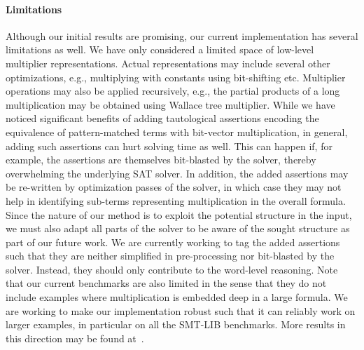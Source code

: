 

%

\paragraph{\bf Limitations}
%
Although our initial results are promising, our current implementation
has several limitations as well.
%
We have only considered a limited space of low-level multiplier
representations.  Actual representations may include several other
optimizations, e.g., multiplying with constants using bit-shifting
etc.
%
Multiplier operations may also be applied recursively, e.g., the
partial products of a long multiplication may be obtained using
Wallace tree multiplier.
%
While we have noticed significant benefits of adding tautological
assertions encoding the equivalence of pattern-matched terms with
bit-vector multiplication, in general, adding such assertions can hurt
solving time as well.  This can happen if, for example, the assertions
are themselves bit-blasted by the solver, thereby overwhelming the
underlying SAT solver.
%
In addition, the added assertions may be re-written by optimization
passes of the solver, in which case they may not help in identifying
sub-terms representing multiplication in the overall formula.
%
Since the nature of our method is to exploit the potential
structure in the input, we must also adapt all parts of the solver
to be aware of the sought structure as part of our future work.
%
We are currently working to tag the added assertions such that they
are neither simplified in pre-processing nor bit-blasted by the solver.
%
Instead, they should only contribute to the word-level reasoning.
%
Note that our current benchmarks are also limited in the sense that
they do not include examples where multiplication is embedded deep in
a large formula.
%
We are working to make our implementation robust such that
it can reliably work on larger examples, in particular on all the 
SMT-LIB benchmarks.
%
More results in this direction may be found at~\cite{arxiv-version}.







